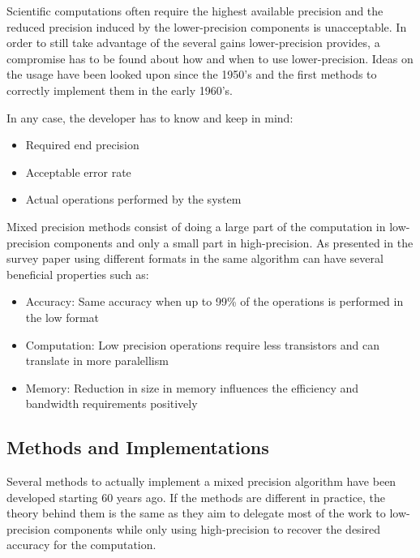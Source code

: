 Scientific computations often require the highest available precision and the reduced precision induced by the lower-precision components is unacceptable. In order to still take advantage of the several gains lower-precision provides, a compromise has to be found about how and when to use lower-precision. Ideas on the usage have been looked upon since the 1950's and the first methods to correctly implement them in the early 1960's.

In any case, the developer has to know and keep in mind:
\begin{itemize}
  \item Required end precision
  \item Acceptable error rate
  \item Actual operations performed by the system
\end{itemize}

Mixed precision methods consist of doing a large part of the computation in low-precision components and only a small part in high-precision. As presented in the survey paper \cite{Goddeke2007} using different formats in the same algorithm can have several beneficial properties such as:
\begin{itemize}
  \item Accuracy: Same accuracy when up to 99\% of the operations is performed in the low format
  \item Computation: Low precision operations require less transistors and can translate in more paralellism
  \item Memory: Reduction in size in memory influences the efficiency and bandwidth requirements positively
\end{itemize}


\subsection{Methods and Implementations}
Several methods to actually implement a mixed precision algorithm have been developed starting 60 years ago. If the methods are different in practice, the theory behind them is the same as they aim to delegate most of the work to low-precision components while only using high-precision to recover the desired accuracy for the computation.


